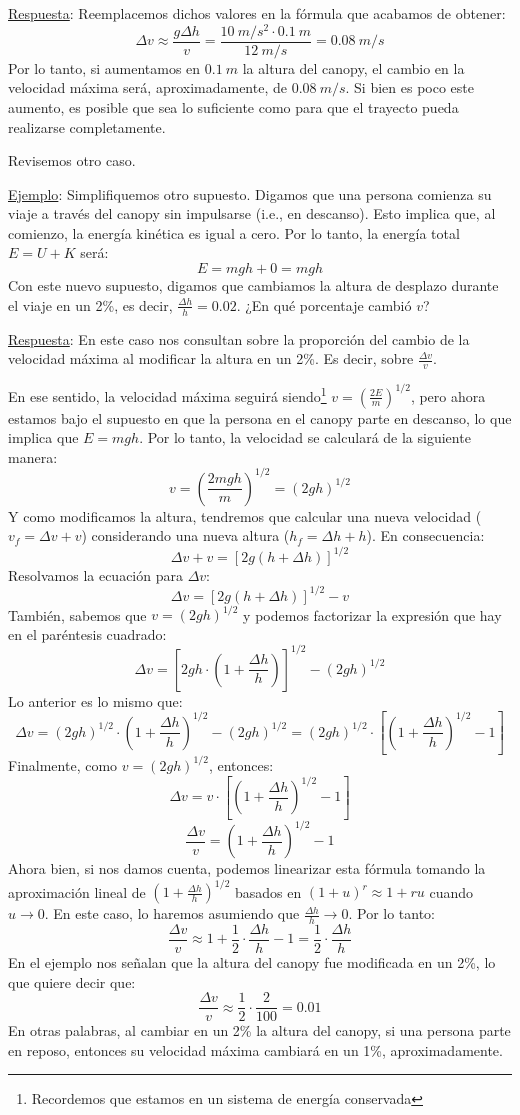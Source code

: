 \documentclass[12pt]{article}
\begin{document}
\underline{Respuesta}: Reemplacemos dichos valores en la fórmula que acabamos de obtener:
\[\Delta v \approx \frac{g \Delta h}{v} =  \frac{10 \ m/s^{2} \cdot 0.1 \ m}{12 \ m/s} = 0.08 \ m/s\]
Por lo tanto, si aumentamos en $0.1 \ m$ la altura del canopy, el cambio en la velocidad máxima será, aproximadamente, de $0.08 \ m/s$. Si bien es poco este aumento, es posible que sea lo suficiente como para que el trayecto pueda realizarse completamente.

Revisemos otro caso.

\underline{Ejemplo}: Simplifiquemos otro supuesto. Digamos que una persona comienza su viaje a través del canopy sin impulsarse (i.e., en descanso). Esto implica que, al comienzo, la energía kinética es igual a cero. Por lo tanto, la energía total $E = U + K$ será:
\[E = mgh + 0 = mgh\]
Con este nuevo supuesto, digamos que cambiamos la altura de desplazo durante el viaje en un 2\%, es decir, $\frac{\Delta h}{h} = 0.02$. ¿En qué porcentaje cambió $v$?

\underline{Respuesta}: En este caso nos consultan sobre la proporción del cambio de la velocidad máxima al modificar la altura en un 2\%. Es decir, sobre $\frac{\Delta v}{v}$.

En ese sentido, la velocidad máxima seguirá siendo\footnote{Recordemos que estamos en un sistema de energía conservada} $v = \left(\frac{2E}{m}\right)^{1/2}$, pero ahora estamos bajo el supuesto en que la persona en el canopy parte en descanso, lo que implica que $E = mgh$. Por lo tanto, la velocidad se calculará de la siguiente manera:
\[v = \left(\frac{2mgh}{m}\right)^{1/2} = (2gh)^{1/2}\]
Y como modificamos la altura, tendremos que calcular una nueva velocidad ($v_{f} = \Delta v + v$) considerando una nueva altura ($h_{f} = \Delta h + h$). En consecuencia:
\[\Delta v + v = \left[2g(h + \Delta h)\right]^{1/2}\]
Resolvamos la ecuación para $\Delta v$:
\[\Delta v = \left[2g(h + \Delta h)\right]^{1/2} - v\]
También, sabemos que $v = (2gh)^{1/2}$ y podemos factorizar la expresión que hay en el paréntesis cuadrado:
\[\Delta v = \left[2gh \cdot \left(1 + \frac{\Delta h}{h}\right)\right]^{1/2} - (2gh)^{1/2}\]
Lo anterior es lo mismo que:
\[\Delta v = \left(2gh\right)^{1/2} \cdot \left(1 + \frac{\Delta h}{h}\right)^{1/2} - (2gh)^{1/2} = \left(2gh\right)^{1/2} \cdot \left[\left(1 + \frac{\Delta h}{h}\right)^{1/2} - 1\right]\]
Finalmente, como $v =(2gh)^{1/2}$, entonces:
\[\Delta v = v \cdot \left[\left(1 + \frac{\Delta h}{h}\right)^{1/2} - 1\right]\]
\[\frac{\Delta v}{v} = \left(1 + \frac{\Delta h}{h}\right)^{1/2} - 1\]
Ahora bien, si nos damos cuenta, podemos linearizar esta fórmula tomando la aproximación lineal de $\left(1 + \frac{\Delta h}{h}\right)^{1/2}$ basados en $(1 + u)^{r} \approx 1 + ru$ cuando $u \to 0$. En este caso, lo haremos asumiendo que $\frac{\Delta h}{h} \to 0$. Por lo tanto:
\[\frac{\Delta v}{v} \approx 1 + \frac{1}{2} \cdot \frac{\Delta h}{h} - 1 = \frac{1}{2} \cdot \frac{\Delta h}{h}\]
En el ejemplo nos señalan que la altura del canopy fue modificada en un 2\%, lo que quiere decir que:
\[\frac{\Delta v}{v} \approx \frac{1}{2} \cdot \frac{2}{100} = 0.01\]
En otras palabras, al cambiar en un 2\% la altura del canopy, si una persona parte en reposo, entonces su velocidad máxima cambiará en un 1\%, aproximadamente.
\end{document}
